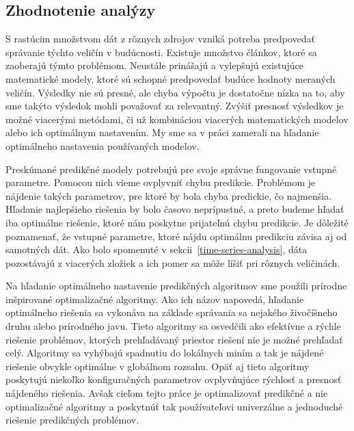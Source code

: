 \documentclass[a4paper,slovak,12pt,appendix]{article}
\begin{document}

\subsection{Zhodnotenie analýzy}
S rastúcim množstvom dát z rôznych zdrojov vzniká potreba predpovedať správanie
týchto veličín v budúcnosti. Existuje množstvo článkov, ktoré sa zaoberajú
týmto problémom. Neustále prinášajú a vylepšujú existujúce matematické modely,
ktoré sú schopné predpovedať budúce hodnoty meraných veličín. Výsledky nie sú
presné, ale chyba výpočtu je dostatočne nízka na to, aby sme takýto výsledok
mohli považovať za relevantný. Zvýšiť presnosť výsledkov je možné viacerými
metódami, či už kombináciou viacerých matematických modelov alebo ich
optimálnym nastavením. My sme sa v práci zamerali na hľadanie optimálneho
nastavenia používaných modelov.

Preskúmané predikčné modely potrebujú pre svoje správne fungovanie vstupné
parametre. Pomocou nich vieme ovplyvniť chybu predikcie. Problémom je nájdenie
takých parametrov, pre ktoré by bola chyba predickie, čo najmenšia. Hľadanie
najlepšieho riešenia by bolo časovo neprípustné, a preto budeme hľadať iba
optimálne riešenie, ktoré nám poskytne prijateľnú chybu predikcie. Je dôležité
poznamenať, že vstupné parametre, ktoré nájdu optimálnu predikciu závisa aj od
samotných dát. Ako bolo spomenuté v sekcii~\ref{time-series-analysis}, dáta
pozostávajú z viacerých zložiek a ich pomer sa môže líšiť pri rôznych
veličinách.

Na hľadanie optimálneho nastavenie predikčných algoritmov sme použili
prírodne inšpirované optimalizačné algoritmy. Ako ich názov napovedá, hľadanie
optimálneho riešenia sa vykonáva na základe správania sa nejakého živočíšneho
druhu alebo prírodného javu. Tieto algoritmy sa osvedčili ako efektívne a
rýchle riešenie problémov, ktorých prehľadávaný priestor riešení nie je možné
prehľadať celý. Algoritmy sa vyhýbajú spadnutiu do lokálnych miním a tak je
nájdené riešenie obvykle optimálne v globálnom rozsahu. Opäť aj tieto algoritmy
poskytujú niekoľko konfiguračných parametrov ovplyvňujúce rýchlosť a presnosť
nájdeného riešenia. Avšak cieľom tejto práce je optimalizovať predikčné
a nie optimalizačné algoritmy a poskytnúť tak používateľovi univerzálne
a jednoduché riešenie predikčných problémov.
\end{document}
